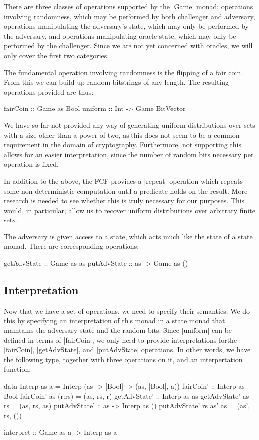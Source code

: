 There are three classes of operations supported by the |Game| monad: operations involving randomness, which may
be performed by both challenger and adversary, operations manipulating the adversary's state, which may only be
performed by the adversary, and operations manipulating oracle state, which may only be performed by the challenger.
Since we are not yet concerned with oracles, we will only cover the first two categories.

The fundamental operation involving randomness is the flipping of a fair coin.  From this we can build up random
bitstrings of any length.  The resulting operations provided are thus:
\begin{code}
fairCoin :: Game as Bool
uniform :: Int -> Game BitVector
\end{code}

We have so far not provided any way of generating uniform distributions over sets with a size other than a power of two,
as this does not seem to be a common requirement in the domain of cryptography.  Furthermore, not supporting this allows
for an easier interpretation, since the number of random bits necessary per operation is fixed.

In addition to the above, the FCF provides a |repeat| operation which repeats some non-deterministic computation until a
predicate holds on the result.  More research is needed to see whether this is truly necessary for our purposes.  This
would, in particular, allow us to recover uniform distributions over arbitrary finite sets.

The adversary is given access to a state, which acts much like the state of a state monad.  There are corresponding
operations:
\begin{code}
getAdvState :: Game as as
putAdvState :: as -> Game as ()
\end{code}

\subsection{Interpretation}

Now that we have a set of operations, we need to specify their semantics.  We do this by specifying an interpretation of
this monad in a state monad that maintains the adversary state and the random bits.  Since |uniform| can be defined in
terms of |fairCoin|, we only need to provide interpretations forthe |fairCoin|, |getAdvState|, and |putAdvState|
operations.  In other words, we have the following type, together with three operations on it, and an interpertation
function:
\begin{code}
    data Interp as a = Interp (as -> [Bool] -> (as, [Bool], a))
    fairCoin' :: Interp as Bool
    fairCoin' as (r:rs) = (as, rs, r)
    getAdvState' :: Interp as as
    getAdvState' as rs = (as, rs, as)
    putAdvState' :: as -> Interp as ()
    putAdvState' rs as' as = (as', rs, ())

    interpret :: Game as a -> Interp as a
\end{code}

